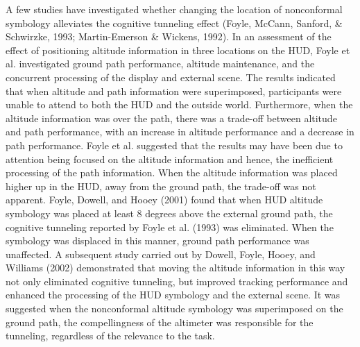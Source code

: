 \documentclass[utf8,bachelor,manualbib]{gradu3}
\begin{document}
A few studies have investigated whether changing the location of nonconformal
symbology alleviates the cognitive tunneling effect (Foyle, McCann, Sanford, \&
Schwirzke, 1993; Martin-Emerson \& Wickens, 1992). In an assessment of the
effect of positioning altitude information in three locations on the HUD, Foyle et
al. investigated ground path performance, altitude maintenance, and the concurrent
processing of the display and external scene. The results indicated that
when altitude and path information were superimposed, participants were unable
to attend to both the HUD and the outside world. Furthermore, when the altitude
information was over the path, there was a trade-off between altitude and path
performance, with an increase in altitude performance and a decrease in path
performance. Foyle et al. suggested that the results may have been due to attention
being focused on the altitude information and hence, the inefficient processing
of the path information. When the altitude information was placed higher up
in the HUD, away from the ground path, the trade-off was not apparent.
Foyle, Dowell, and Hooey (2001) found that when HUD altitude symbology
was placed at least 8 degrees above the external ground path, the cognitive tunneling reported
by Foyle et al. (1993) was eliminated. When the symbology was displaced
in this manner, ground path performance was unaffected. A subsequent
study carried out by Dowell, Foyle, Hooey, and Williams (2002) demonstrated
that moving the altitude information in this way not only eliminated cognitive
tunneling, but improved tracking performance and enhanced the processing of
the HUD symbology and the external scene. It was suggested when the
nonconformal altitude symbology was superimposed on the ground path, the
compellingness of the altimeter was responsible for the tunneling, regardless of
the relevance to the task.
\end{document}
